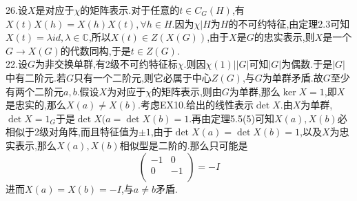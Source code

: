 26.设$X$是对应于$\chi$的矩阵表示.对于任意的$t\in C_G(H)$,有$X(t)X(h)=X(h)X(t),\forall h\in H$.因为$\chi|H$为$H$的不可约特征,由定理2.3可知$X(t)=\lambda id,\lambda\in\mathbb{C}$,所以$X(t)\in Z(X(G))$,由于$X$是$G$的忠实表示,则$X$是一个$G\to X(G)$的代数同构,于是$t\in Z(G)$.\\
22.设$G$为非交换单群,有2级不可约特征标$\chi$.则因$\chi(1)||G|$可知$|G|$为偶数.于是$|G|$中有二阶元.若$G$只有一个二阶元,则它必属于中心$Z(G)$,与$G$为单群矛盾.故$G$至少有两个二阶元$a,b$.假设$X$为对应于$\chi$的矩阵表示,则由$G$为单群,那么$\ker X={1}$,即$X$是忠实的,那么$X(a)\neq X(b)$.考虑EX10.给出的线性表示$\det X$.由$X$为单群,$\det X=1_{G}$于是$\det X(a=\det X(b)=1.$再由定理5.5(5)可知$X(a),X(b)$必相似于2级对角阵,而且特征值为$\pm 1$,由于$\det X(a)=\det X(b)=1$,以及$X$为忠实表示,那么$X(a),X(b)$相似型是二阶的.那么只可能是
\[\left( 
\begin{array}{cc}
-1 & 0\\
0 & -1\\
\end{array}\right)=-I\]
进而$X(a)=X(b)=-I$,与$a\neq b$矛盾.
